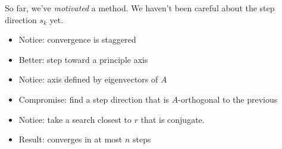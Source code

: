 \documentclass[10pt]{beamer}
\begin{document}
\begin{frame}[fragile]
So far, we've \emph{motivated} a method.  We haven't been careful about the 
step direction $s_k$ yet.  
\begin{itemize}
\item<1-> Notice: convergence is staggered
\item<2-> Better: step toward a principle axis
\item<3-> Notice: axis defined by eigenvectors of $A$
\item<4-> Compromise: find a step direction that is $A$-orthogonal to the previous
\item<5-> Notice: take a search closest to $r$ that is conjugate.
\item<6-> Result: converges in at most $n$ steps 
\end{itemize}
\end{frame}
\end{document}
